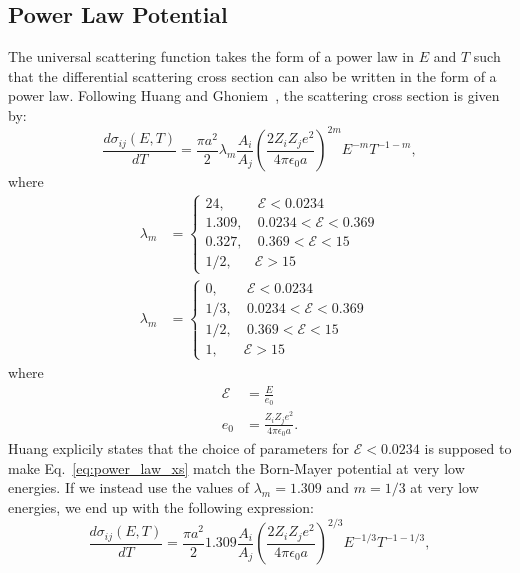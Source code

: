 \documentclass[review]{elsarticle}
\begin{document}
\subsection{Power Law Potential}
The universal scattering function takes the form of a power law in $E$ and $T$ such that the differential scattering cross section can also be written in the form of a power law. Following Huang and Ghoniem~\cite{Huang1993}, the scattering cross section is given by:
\begin{equation}\label{eq:power_law_xs}
    \frac{d \sigma_{ij}(E,T)}{dT} = \frac{\pi a^2}{2} \lambda_m \frac{A_i}{A_j} \left( \frac{2 Z_i Z_j e^2}{4 \pi \epsilon_0 a} \right)^{2m} E^{-m}T^{-1-m},
\end{equation}
where
\begin{align}
 \lambda_m &= \left\{ \begin{array}{ll}
         24, & ~ \mathcal{E} < 0.0234\\
         1.309, & ~0.0234< \mathcal{E} < 0.369  \\
         0.327, & ~0.369< \mathcal{E} <  15 \\
         1/2, & \mathcal{E} > 15 \end{array} \right.  \nonumber \\
 \lambda_m &= \left\{ \begin{array}{ll}
         0, & ~ \mathcal{E} < 0.0234\\
         1/3, & ~0.0234< \mathcal{E} < 0.369  \\
         1/2, & ~0.369< \mathcal{E} <  15\\
         1, & \mathcal{E} > 15 \end{array} \right. 
\end{align} 
where
\begin{align}
   \mathcal{E} &= \frac{E}{e_0} \nonumber \\
   e_0 &= \frac{Z_i Z_j e^2}{4 \pi \epsilon_0 a}.
\end{align}
Huang explicily states that the choice of parameters for $\mathcal{E} < 0.0234$ is supposed to make Eq.~\ref{eq:power_law_xs} match the Born-Mayer potential at very low energies. If we instead use the values of $\lambda_m=1.309$ and $m=1/3$ at very low energies, we end up with the following expression:
\begin{equation}\label{eq:power_law_xs}
    \frac{d \sigma_{ij}(E,T)}{dT} = \frac{\pi a^2}{2} 1.309 \frac{A_i}{A_j} \left( \frac{2 Z_i Z_j e^2}{4 \pi \epsilon_0 a} \right)^{2/3} E^{-1/3} T^{-1-1/3},
\end{equation}
\end{document}
